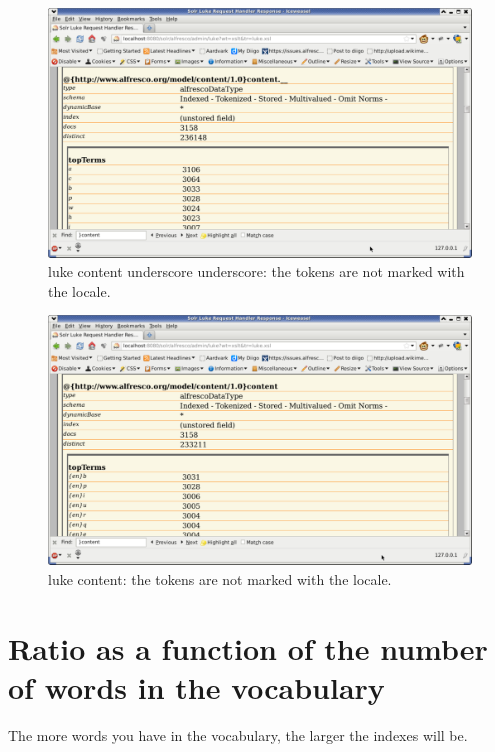 \documentclass[12pt,a4]{article}
\begin{document}
\begin{figure}[h]
\begin{center}
\includegraphics[width=130mm]{luke_content__}
\end{center}
\caption{luke content underscore underscore: the tokens are not marked with the locale.}
\end{figure}



\begin{figure}[h]
\begin{center}
\includegraphics[width=130mm]{luke_content}
\end{center}
\caption{luke content: the tokens are not marked with the locale.}
\end{figure}

\section{Ratio as a function of the number of words in the vocabulary}
The more words you have in the vocabulary, the larger the indexes will be.
\end{document}
